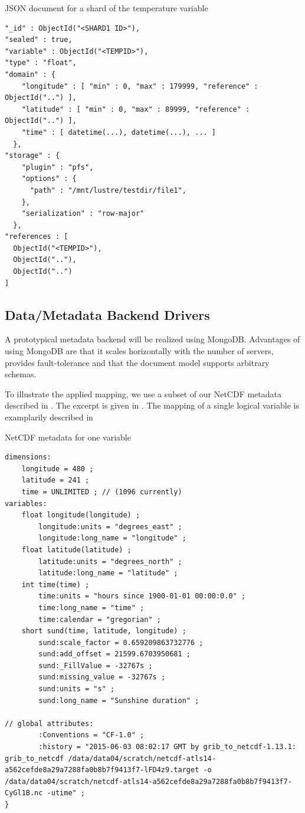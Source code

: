 \documentclass{../../template/esiwace-report}
\begin{document}
\begin{tcbcode}[label={lst:mongotemperatureshard}]{JSON document for a shard of the temperature variable}
\begin{lstlisting}
"_id" : ObjectId("<SHARD1 ID>"),
"sealed" : true,
"variable" : ObjectId("<TEMPID>"),
"type" : "float",
"domain" : {
    "longitude" : [ "min" : 0, "max" : 179999, "reference" : ObjectId("..") ],
    "latitude" : [ "min" : 0, "max" : 89999, "reference" : ObjectId("..") ],
    "time" : [ datetime(...), datetime(...), ... ]
  },
"storage" : {
    "plugin" : "pfs",
    "options" : {
      "path" : "/mnt/lustre/testdir/file1",
    },
    "serialization" : "row-major"
  },
"references : [
  ObjectId("<TEMPID>"),
  ObjectId(".."),
  ObjectId("..")
]
\end{lstlisting}
\end{tcbcode}

\subsection{Data/Metadata Backend Drivers}
A prototypical metadata backend will be realized using MongoDB.
Advantages of using MongoDB are that it scales horizontally with the number of servers, provides fault-tolerance and that the document model supports arbitrary schemas.


To illustrate the applied mapping, we use a subset of our NetCDF metadata described in .
The excerpt is given in .
The mapping of a single logical variable is examplarily described in


\begin{tcbcode}[label={lst:NetCDF-data-map}]{NetCDF metadata for one variable}
\begin{lstlisting}
dimensions:
	longitude = 480 ;
	latitude = 241 ;
	time = UNLIMITED ; // (1096 currently)
variables:
	float longitude(longitude) ;
		longitude:units = "degrees_east" ;
		longitude:long_name = "longitude" ;
	float latitude(latitude) ;
		latitude:units = "degrees_north" ;
		latitude:long_name = "latitude" ;
	int time(time) ;
		time:units = "hours since 1900-01-01 00:00:0.0" ;
		time:long_name = "time" ;
		time:calendar = "gregorian" ;
	short sund(time, latitude, longitude) ;
		sund:scale_factor = 0.659209863732776 ;
		sund:add_offset = 21599.6703950681 ;
		sund:_FillValue = -32767s ;
		sund:missing_value = -32767s ;
		sund:units = "s" ;
		sund:long_name = "Sunshine duration" ;
		
// global attributes:
		:Conventions = "CF-1.0" ;
		:history = "2015-06-03 08:02:17 GMT by grib_to_netcdf-1.13.1: grib_to_netcdf /data/data04/scratch/netcdf-atls14-a562cefde8a29a7288fa0b8b7f9413f7-lFD4z9.target -o /data/data04/scratch/netcdf-atls14-a562cefde8a29a7288fa0b8b7f9413f7-CyGl1B.nc -utime" ;
}
\end{lstlisting}
\end{tcbcode}
\end{document}
